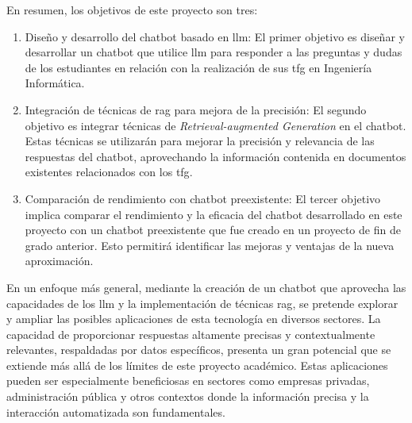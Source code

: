En resumen, los objetivos de este proyecto son tres:
\begin{enumerate}
    \item Diseño y desarrollo del chatbot basado en \acrshort{llm}: El primer objetivo es diseñar y desarrollar un chatbot que utilice \acrlong{llm} para responder a las preguntas y dudas de los estudiantes en relación con la realización de sus \acrlong{tfg} en Ingeniería Informática.
    
    \item Integración de técnicas de \acrshort{rag} para mejora de la precisión: El segundo objetivo es integrar técnicas de \textit{Retrieval-augmented Generation} en el chatbot. Estas técnicas se utilizarán para mejorar la precisión y relevancia de las respuestas del chatbot, aprovechando la información contenida en documentos existentes relacionados con los \acrshort{tfg}.

    \item Comparación de rendimiento con chatbot preexistente: El tercer objetivo implica comparar el rendimiento y la eficacia del chatbot desarrollado en este proyecto con un chatbot preexistente que fue creado en un proyecto de fin de grado anterior. Esto permitirá identificar las mejoras y ventajas de la nueva aproximación.
    
\end{enumerate}

En un enfoque más general, mediante la creación de un chatbot que aprovecha las capacidades de los \acrshort{llm} y la implementación de técnicas \acrshort{rag}, se pretende explorar y ampliar las posibles aplicaciones de esta tecnología en diversos sectores. La capacidad de proporcionar respuestas altamente precisas y contextualmente relevantes, respaldadas por datos específicos, presenta un gran potencial que se extiende más allá de los límites de este proyecto académico. Estas aplicaciones pueden ser especialmente beneficiosas en sectores como empresas privadas, administración pública y otros contextos donde la información precisa y la interacción automatizada son fundamentales.






